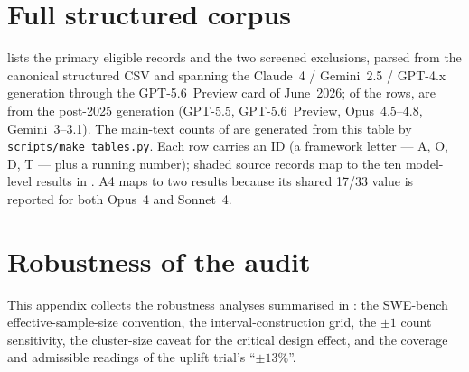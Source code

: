 \documentclass{article}
\begin{document}







\appendix
{} %
\setcounter{table}{0}
\renewcommand{\thetable}{A\arabic{table}}
\setcounter{figure}{0}
\renewcommand{\thefigure}{A\arabic{figure}}
\section{Full structured corpus}
\label{app:census}
 lists the \CensusTotal{} primary eligible records and the two screened
exclusions, parsed from the canonical structured CSV and spanning the Claude~4 / Gemini~2.5 / GPT-4.x
generation through the GPT-5.6~Preview card of June~2026; of the \CensusTotal{} rows,
\CensusPostRows{} are from the post-2025 generation (GPT-5.5, GPT-5.6~Preview,
Opus~4.5--4.8, Gemini~3--3.1). The main-text counts of  are generated from
this table by \texttt{scripts/make\_tables.py}. Each row carries an ID (a framework letter
--- A, O, D, T --- plus a running number); shaded source records map to the ten model-level
results in . A4 maps to two results because its shared 17/33 value is
reported for both Opus~4 and Sonnet~4.

\begin{landscape}

\end{landscape}


\section{Robustness of the audit}
\label{app:robustness}
This appendix collects the robustness analyses summarised in :
the SWE-bench effective-sample-size convention, the interval-construction grid, the
$\pm 1$ count sensitivity, the cluster-size caveat for the critical design effect, and
the coverage and admissible readings of the uplift trial's ``$\pm 13\%$''.




\end{document}
